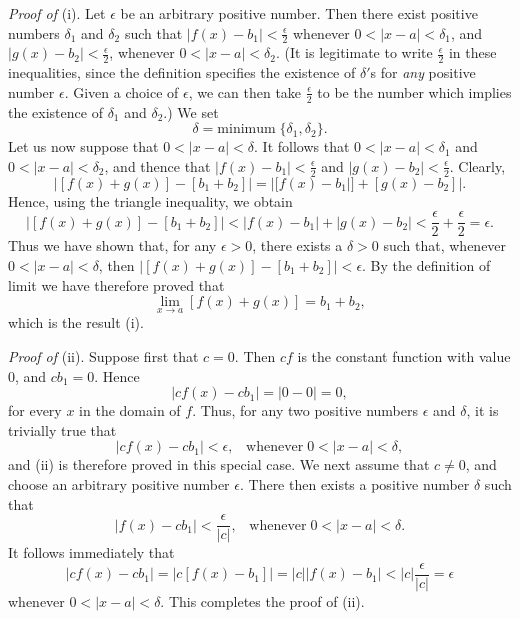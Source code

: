 \noindent \textit{Proof of} (i). Let $\epsilon$ be an arbitrary positive number. Then there exist positive numbers $\delta_1$ and $\delta_2$ such that $|f(x) - b_1| < \frac{\epsilon}{2}$ whenever $0 < |x - a| < \delta_1$, and $|g(x) - b_2| < \frac{\epsilon}{2}$, whenever $0 < |x - a| < \delta_2$. (It is legitimate to write
$\frac{\epsilon}{2}$ in these inequalities, since the definition specifies the existence of $\delta'$s for \textit{any} positive number $\epsilon$. Given a choice of $\epsilon$, we can then take $\frac{\epsilon}{2}$ to be the number which implies the existence of $\delta_1$ and $\delta_2$.) We set
$$
\delta = \mbox{minimum}\; \{ \delta_1, \delta_2 \}. 
$$
Let us now suppose that $0 < |x - a| < \delta$. It follows that $0 < |x - a| < \delta_1$ and $0 < |x - a| < \delta_2$, and thence that $|f(x) - b_1| < \frac{\epsilon}{2}$ and $|g(x) - b_2| < \frac{\epsilon}{2}$. Clearly,
$$
|[f(x) + g(x)] - [b_1 + b_2]| = |[f(x) - b_1|] + [g(x) - b_2]|. 
$$
Hence, using the triangle inequality, we obtain
$$
|[f(x) + g(x)] - [b_1 + b_2]| < |f(x) - b_1| + |g(x) - b_2| < \frac{\epsilon}{2} + \frac{\epsilon}{2} = \epsilon .
$$
Thus we have shown that, for any $\epsilon > 0$, there exists a $ \delta > 0$ such that, whenever $0 < |x - a| < \delta$, then $|[f(x) + g(x)] - [b_1 + b_2]| < \epsilon$. By the definition of limit we have therefore proved that 
$$
\lim_{x \rightarrow a} [f(x) + g(x)] = b_1 + b_2,
$$
which is the result (i).
\medskip

\noindent \textit{Proof of} (ii). Suppose first that $c = 0$. Then $cf$ is the constant function with value 0, and $cb_1 = 0$. Hence
$$
|cf(x) - cb_1| = |0 - 0| = 0 ,
$$
for every $x$ in the domain of $f$. Thus, for any two positive numbers $\epsilon$ and $\delta$, it is trivially true that
$$
|cf(x) - cb_1| < \epsilon, \;\;\;\mbox{whenever}\; 0 < |x - a| < \delta,
$$
and (ii) is therefore proved in this special case. We next assume that $c \neq 0$, and choose an arbitrary positive number $\epsilon$. There then exists a positive number $\delta$ such that
$$
|f(x) - cb_1| < \frac{\epsilon}{|c|} , \;\;\;\mbox{whenever}\; 0 < |x - a| < \delta.
$$
It follows immediately that
$$
|cf(x) - cb_1| = |c[ f(x) - b_1]| = |c| |f(x) - b_1| < |c| \frac{\epsilon}{|c|} = \epsilon
$$
whenever $0 < |x - a| < \delta$. This completes the proof of (ii).
\medskip

